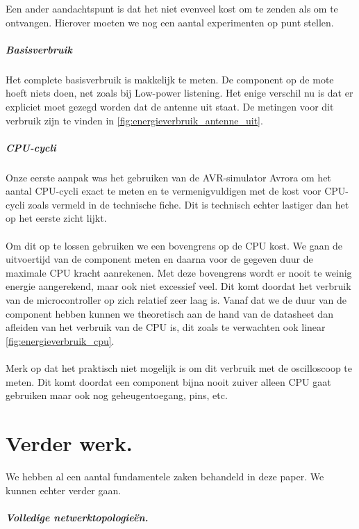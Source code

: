 \documentclass{article}
\begin{document}
Een ander aandachtspunt is dat het niet evenveel kost om te zenden als om te
ontvangen. Hierover moeten we nog een aantal experimenten op punt stellen.

\subparagraph{Basisverbruik}

Het complete basisverbruik is makkelijk te meten. De component op de mote hoeft niets doen, net zoals bij Low-power listening. Het enige verschil nu is dat er expliciet moet gezegd worden dat de antenne uit staat.
De metingen voor dit verbruik zijn te vinden in \ref{fig:energieverbruik_antenne_uit}.

\subparagraph{CPU-cycli}

Onze eerste aanpak was het gebruiken van de AVR-simulator Avrora
\cite{titzer2005avrora} om het aantal CPU-cycli exact te meten en te
vermenigvuldigen met de kost voor CPU-cycli zoals vermeld in de technische
fiche. Dit is technisch echter lastiger dan het op het eerste zicht lijkt.
\\
\\
Om dit op te lossen gebruiken we een bovengrens op de CPU kost. We gaan de uitvoertijd van de component meten en daarna voor de gegeven duur de maximale CPU kracht aanrekenen. Met deze bovengrens wordt er nooit te weinig energie aangerekend, maar ook niet excessief veel. Dit komt doordat het verbruik van de microcontroller op zich relatief zeer laag is. Vanaf dat we de duur van de component hebben kunnen we theoretisch aan de hand van de datasheet dan afleiden van het verbruik van de CPU is, dit zoals te verwachten ook linear \ref{fig:energieverbruik_cpu}.\\
\\
Merk op dat het praktisch niet mogelijk is om dit verbruik met de oscilloscoop te meten.
Dit komt doordat een component bijna nooit zuiver alleen CPU gaat gebruiken maar ook nog geheugentoegang, pins, etc. 

\section{Verder werk.} 

We hebben al een aantal fundamentele zaken behandeld in deze paper. We kunnen
echter verder gaan.
 
\subparagraph{Volledige netwerktopologie\"en.}
\end{document}
